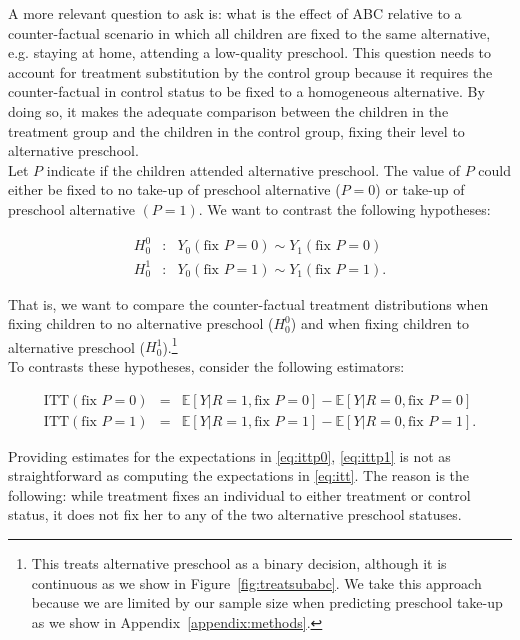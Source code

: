 \noindent A more relevant question to ask is: what is the effect of ABC relative to a counter-factual scenario in which all children are fixed to the same alternative, e.g. staying at home, attending a low-quality preschool. This question needs to account for treatment substitution by the control group because it requires the counter-factual in control status to be fixed to a homogeneous alternative. By doing so, it makes the adequate comparison between the children in the treatment group and the children in the control group, fixing their level to alternative preschool.\\

\noindent Let $P$ indicate if the children attended alternative preschool. The value of $P$ could either be fixed to no take-up of preschool alternative ($P = 0$) or take-up of preschool alternative $(P = 1)$. We want to contrast the following hypotheses: 

\begin{eqnarray}
H_{0}^0 &:& Y_{0} \left( \text{fix } P = 0 \right) \sim Y_{1} \left( \text{fix } P = 0 \right) \\
H_{0}^1 &:& Y_{0} \left( \text{fix } P = 1 \right) \sim Y_{1} \left( \text{fix } P = 1\right). 
\end{eqnarray}

\noindent That is, we want to compare the counter-factual treatment distributions when fixing children to no alternative preschool ($H_{0}^0$) and when fixing children to alternative preschool ($H_{0}^1$).\footnote{This treats alternative preschool as a binary decision, although it is continuous as we show in Figure~\ref{fig:treatsubabc}. We take this approach because we are limited by our sample size when predicting preschool take-up as we show in Appendix~\ref{appendix:methods}.}\\

\noindent To contrasts these hypotheses, consider the following estimators: 

\begin{eqnarray}
\text{ITT} \left( \text{fix } P = 0 \right) &=& \mathbb{E} \left[ Y | R = 1, \text{fix } P = 0 \right] - \mathbb{E} \left[ Y | R = 0, \text{fix } P = 0 \right] \label{eq:ittp0} \\
\text{ITT} \left( \text{fix } P = 1 \right) &=& \mathbb{E} \left[ Y | R = 1, \text{fix } P = 1 \right] - \mathbb{E} \left[ Y | R = 0, \text{fix } P = 1 \right]. \label{eq:ittp1}  
\end{eqnarray}

\noindent Providing estimates for the expectations in \eqref{eq:ittp0}, \eqref{eq:ittp1} is not as straightforward as computing the expectations in \eqref{eq:itt}. The reason is the following: while treatment fixes an individual to either treatment or control status, it does not fix her to any of the two alternative preschool statuses.\\

